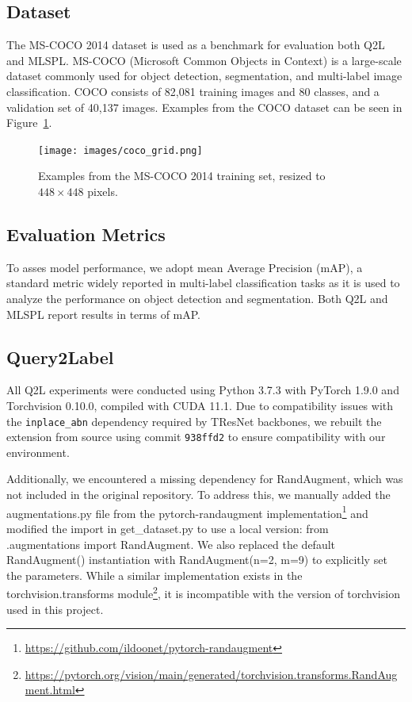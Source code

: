 \documentclass[lettersize,journal]{IEEEtran}
\begin{document}
\subsection{Dataset}
The MS-COCO 2014 \cite{coco14} dataset is used as a benchmark for evaluation both Q2L and MLSPL. MS-COCO (Microsoft Common Objects in Context) is a large-scale dataset commonly used for object detection, segmentation, and multi-label image classification. COCO consists of 82,081 training images and 80 classes, and a validation set of 40,137 images. Examples from the COCO dataset can be seen in Figure~\ref{fig:coco-examples}.

\begin{figure}[t]
    \centering
    \texttt{[image: images/coco\_grid.png]}
    \caption{Examples from the MS-COCO 2014 training set, resized to $448 \times 448$ pixels.}
    \label{fig:coco-examples}
\end{figure}

\subsection{Evaluation Metrics}
To asses model performance, we adopt mean Average Precision (mAP), a standard metric widely reported in multi-label classification tasks as it is used to analyze the performance on object detection and segmentation. Both Q2L and MLSPL report results in terms of mAP. 

\subsection{Query2Label}
All Q2L experiments were conducted using Python 3.7.3 with PyTorch 1.9.0 and Torchvision 0.10.0, compiled with CUDA 11.1. Due to compatibility issues with the \texttt{inplace\_abn} dependency required by TResNet backbones, we rebuilt the extension from source using commit \texttt{938ffd2} to ensure compatibility with our environment.

Additionally, we encountered a missing dependency for RandAugment, which was not included in the original repository. To address this, we manually added the augmentations.py file from the pytorch-randaugment implementation\footnote{\url{https://github.com/ildoonet/pytorch-randaugment}} and modified the import in get\_dataset.py to use a local version: from .augmentations import RandAugment. We also replaced the default RandAugment() instantiation with RandAugment(n=2, m=9) to explicitly set the parameters. While a similar implementation exists in the torchvision.transforms module\footnote{\url{https://pytorch.org/vision/main/generated/torchvision.transforms.RandAugment.html}}, it is incompatible with the version of torchvision used in this project.
\end{document}
